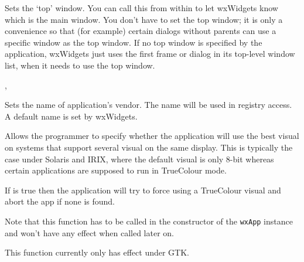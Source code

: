 Sets the `top' window. You can call this from within  to
let wxWidgets know which is the main window. You don't have to set the top window;
it is only a convenience so that (for example) certain dialogs without parents can use a
specific window as the top window. If no top window is specified by the application,
wxWidgets just uses the first frame or dialog in its top-level window list, when it
needs to use the top window.




, 



\label{wxappsetvendorname}


Sets the name of application's vendor. The name will be used
in registry access. A default name is set by
wxWidgets.




\label{wxappsetusebestvisual}


Allows the programmer to specify whether the application will use the best visual
on systems that support several visual on the same display. This is typically the
case under Solaris and IRIX, where the default visual is only 8-bit whereas certain
applications are supposed to run in TrueColour mode.

If  is true then the application will try to force
using a TrueColour visual and abort the app if none is found.

Note that this function has to be called in the constructor of the {\tt wxApp} 
instance and won't have any effect when called later on.

This function currently only has effect under GTK.




\label{wxapphandleevent}

